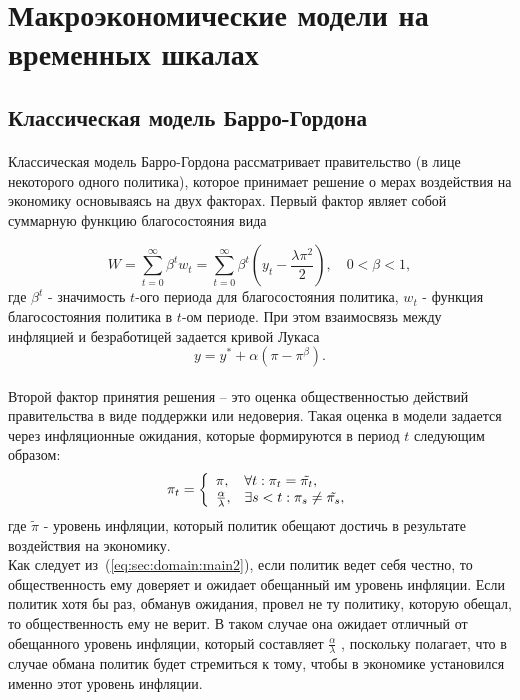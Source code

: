 \section{Макроэкономические модели на временных шкалах}
\subsection{Классическая модель Барро-Гордона}
\label{sec:domain}

\paragraph{} Классическая модель Барро-Гордона рассматривает правительство (в лице некоторого одного политика), которое принимает решение о мерах воздействия на экономику основываясь на двух факторах. Первый фактор являет собой суммарную функцию благосостояния вида

\begin{equation}
 \label{eq:sec:domain:main}
W=\sum_{t=0}^{\infty}\beta^t w_t = \sum_{t=0}^{\infty}\beta^t\left(y_t-\frac{\lambda\pi^2}{2}\right), \quad 0<\beta<1,
\end{equation}
где $\beta^t$ - значимость $t$-ого периода для благосостояния политика, $w_t$ - функция благосостояния политика в $t$-ом периоде. При этом взаимосвязь между инфляцией и безработицей задается кривой Лукаса
\begin{equation}
	\label{eq:sec:domain:main1}
	y=y^*+\alpha(\pi-\pi^\beta).
\end{equation}\\
Второй фактор принятия решения -- это оценка общественностью действий правительства в виде поддержки или недоверия. Такая оценка в модели задается через инфляционные ожидания, которые формируются в период $t$ следующим образом:
\begin{equation}
\label{eq:sec:domain:main2}
\pi_t = \left\{  \begin{array}{l l}
{\pi}, & \forall t:\pi_t=\tilde{\pi_t}, \\ 
\frac{\alpha}{\lambda}, & \exists s < t : \pi_s \ne \tilde{\pi_s},
\end{array} \right. 
\end{equation}
где $\tilde{\pi}$ - уровень инфляции, который политик обещают достичь в результате воздействия на экономику.
\\

Как следует из~(\ref{eq:sec:domain:main2}), если политик ведет себя честно, то общественность ему доверяет и ожидает обещанный им уровень инфляции. Если политик хотя бы раз, обманув ожидания, провел не ту политику, которую обещал, то общественность ему не верит. В таком случае она ожидает отличный от обещанного уровень инфляции, который составляет $\frac{\alpha}{\lambda}$ , поскольку полагает, что в случае обмана политик будет стремиться к тому, чтобы в экономике установился именно этот уровень инфляции.
\\

